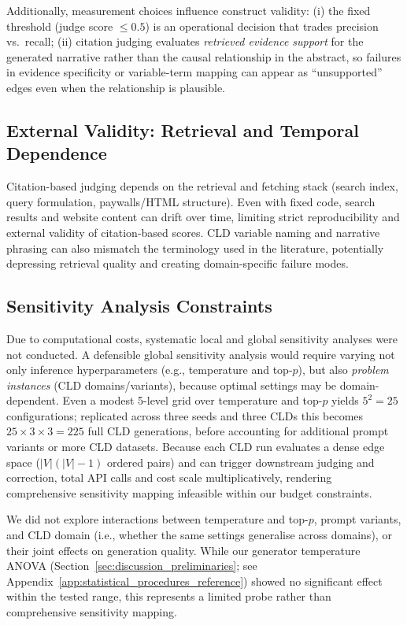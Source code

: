 Additionally, measurement choices influence construct validity: (i) the fixed threshold (judge score $\le 0.5$) is an operational decision that trades precision vs.\ recall; (ii) citation judging evaluates \textit{retrieved evidence support} for the generated narrative rather than the causal relationship in the abstract, so failures in evidence specificity or variable-term mapping can appear as ``unsupported'' edges even when the relationship is plausible.

\subsection{External Validity: Retrieval and Temporal Dependence}

Citation-based judging depends on the retrieval and fetching stack (search index, query formulation, paywalls/HTML structure). Even with fixed code, search results and website content can drift over time, limiting strict reproducibility and external validity of citation-based scores. CLD variable naming and narrative phrasing can also mismatch the terminology used in the literature, potentially depressing retrieval quality and creating domain-specific failure modes.

\subsection{Sensitivity Analysis Constraints}

Due to computational costs, systematic local and global sensitivity analyses were not conducted. A defensible global sensitivity analysis would require varying not only inference hyperparameters (e.g., temperature and top-$p$), but also \textit{problem instances} (CLD domains/variants), because optimal settings may be domain-dependent. Even a modest 5-level grid over temperature and top-$p$ yields $5^2 = 25$ configurations; replicated across three seeds and three CLDs this becomes $25 \times 3 \times 3 = 225$ full CLD generations, before accounting for additional prompt variants or more CLD datasets. Because each CLD run evaluates a dense edge space ($|V|(|V|-1)$ ordered pairs) and can trigger downstream judging and correction, total API calls and cost scale multiplicatively, rendering comprehensive sensitivity mapping infeasible within our budget constraints.

We did not explore interactions between temperature and top-$p$, prompt variants, and CLD domain (i.e., whether the same settings generalise across domains), or their joint effects on generation quality. While our generator temperature ANOVA (Section~\ref{sec:discussion_preliminaries}; see Appendix~\ref{app:statistical_procedures_reference}) showed no significant effect within the tested range, this represents a limited probe rather than comprehensive sensitivity mapping.

